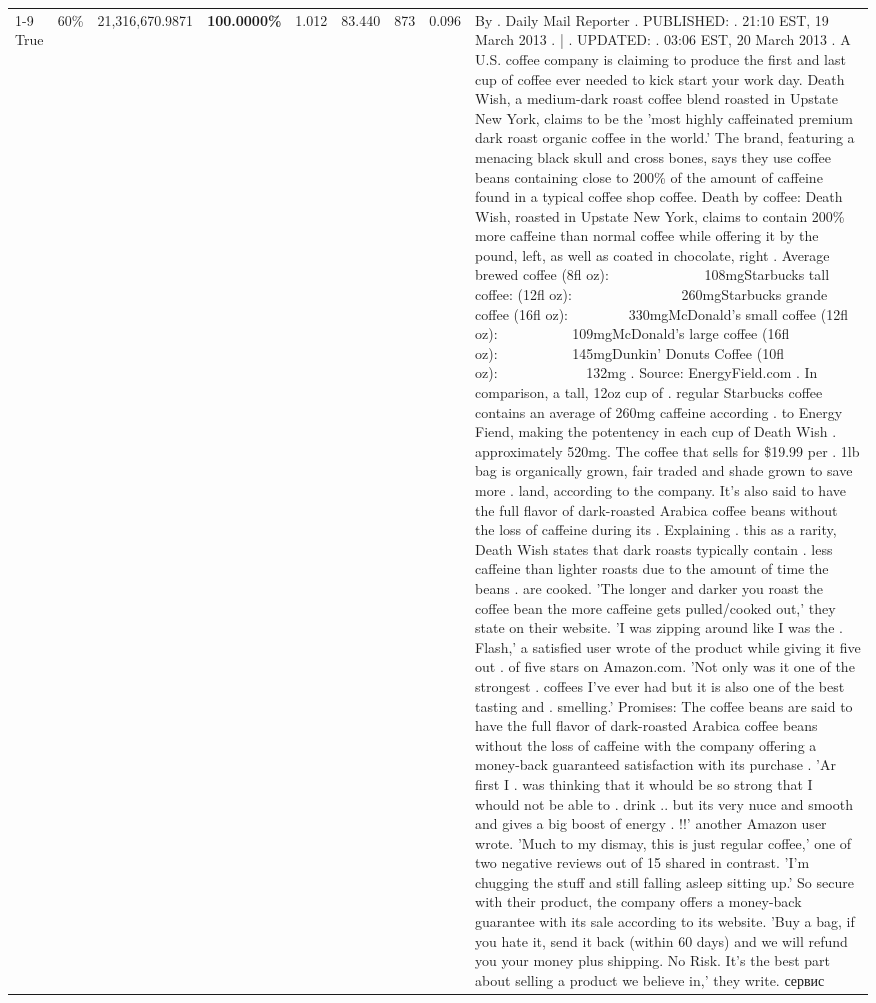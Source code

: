 \begin{table}[H]
{\begin{tabular}{lllrlllll}
\cline{1-9} \cline{2-9}
True & 60\% & 21,316,670.9871 & \bfseries \color{red} 100.0000\% & 1.012 & 83.440 & 873 & 0.096 & By . Daily Mail Reporter . PUBLISHED: . 21:10 EST, 19 March 2013 . | . UPDATED: . 03:06 EST, 20 March 2013 . A U.S. coffee company is claiming to produce the first and last cup of coffee ever needed to kick start your work day. Death Wish, a medium-dark roast coffee blend roasted in Upstate New York, claims to be the 'most highly caffeinated premium dark roast organic coffee in the world.' The brand, featuring a menacing black skull and cross bones, says they use coffee beans containing close to 200\% of the amount of caffeine found in a typical coffee shop coffee. Death by coffee: Death Wish, roasted in Upstate New York, claims to contain 200\% more caffeine than normal coffee while offering it by the pound, left, as well as coated in chocolate, right . Average brewed coffee (8fl oz):              108mgStarbucks tall coffee: (12fl oz):                260mgStarbucks grande coffee (16fl oz):         330mgMcDonald's small coffee (12fl oz):           109mgMcDonald's large coffee (16fl oz):           145mgDunkin' Donuts Coffee (10fl oz):             132mg . Source: EnergyField.com . In comparison, a tall, 12oz cup of . regular Starbucks coffee contains an average of 260mg caffeine according . to Energy Fiend, making the potentency in each cup of Death Wish . approximately 520mg. The coffee that sells for \$19.99 per . 1lb bag is organically grown, fair traded and shade grown to save more . land, according to the company. It's also said to have the full flavor of dark-roasted Arabica coffee beans without the loss of caffeine during its . Explaining . this as a rarity, Death Wish states that dark roasts typically contain . less caffeine than lighter roasts due to the amount of time the beans . are cooked. 'The longer and darker you roast the coffee bean the more caffeine gets pulled/cooked out,' they state on their website. 'I was zipping around like I was the . Flash,' a satisfied user wrote of the product while giving it five out . of five stars on Amazon.com. 'Not only was it one of the strongest . coffees I've ever had but it is also one of the best tasting and . smelling.’ Promises: The coffee beans are said to have the full flavor of dark-roasted Arabica coffee beans without the loss of caffeine with the company offering a money-back guaranteed satisfaction with its purchase . 'Ar first I . was thinking that it whould be so strong that I whould not be able to . drink .. but its very nuce and smooth and gives a big boost of energy . !!' another Amazon user wrote. 'Much to my dismay, this is just regular coffee,' one of two negative reviews out of 15 shared in contrast. 'I'm chugging the stuff and still falling asleep sitting up.' So secure with their product, the company offers a money-back guarantee with its sale according to its website. 'Buy a bag, if you hate it, send it back (within 60 days) and we will refund you your money plus shipping. No Risk. It’s the best part about selling a product we believe in,' they write. сервис \\

\end{tabular}}
\end{table}

